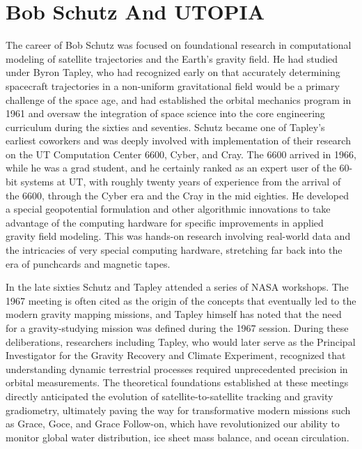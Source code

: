 \chapter{Bob Schutz And UTOPIA}

The career of Bob Schutz was focused on foundational research in computational modeling of satellite trajectories and the Earth's gravity field. He had studied under Byron Tapley, who had recognized early on that accurately determining spacecraft trajectories in a non-uniform gravitational field would be a primary challenge of the space age, and had established the orbital mechanics program in 1961 and oversaw the integration of space science into the core engineering curriculum during the sixties and seventies. Schutz became one of Tapley’s earliest coworkers and was deeply involved with implementation of their research on the UT Computation Center 6600, Cyber, and Cray. The 6600 arrived in 1966, while he was a grad student, and he certainly ranked as an expert user of the 60-bit systems at UT, with roughly twenty years of experience from the arrival of the 6600, through the Cyber era and the Cray in the mid eighties. He developed a special geopotential formulation and other algorithmic innovations to take advantage of the computing hardware for specific improvements in applied gravity field modeling. This was hands-on research involving real-world data and the intricacies of very special computing hardware, stretching far back into the era of punchcards and magnetic tapes.

In the late sixties Schutz and Tapley attended a series of NASA workshops. The 1967 meeting is often cited as the origin of the concepts that eventually led to the modern gravity mapping missions, and Tapley himself has noted that the need for a gravity-studying mission was defined during the 1967 session. During these deliberations, researchers including Tapley, who would later serve as the Principal Investigator for the Gravity Recovery and Climate Experiment, recognized that understanding dynamic terrestrial processes required unprecedented precision in orbital measurements. The theoretical foundations established at these meetings directly anticipated the evolution of satellite-to-satellite tracking and gravity gradiometry, ultimately paving the way for transformative modern missions such as Grace, Goce, and Grace Follow-on, which have revolutionized our ability to monitor global water distribution, ice sheet mass balance, and ocean circulation. \cite{nrcUsefulApplicationsEarthoriented1969}

